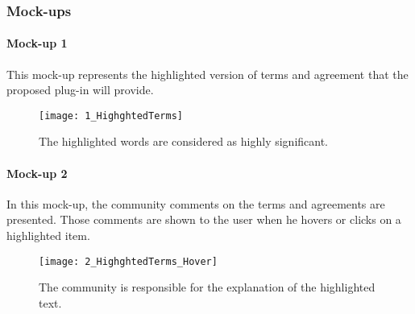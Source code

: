 \subsubsection{Mock-ups}

\paragraph{Mock-up 1}
This mock-up represents the highlighted version of terms and agreement that the 
proposed plug-in will provide.

\begin{figure}[H]
\centering
\texttt{[image: 1\_HighghtedTerms]}
\caption{The highlighted words are considered as highly significant.}
\end{figure}

\paragraph{Mock-up 2}
In this mock-up, the community comments on the terms and agreements are 
presented. Those comments are shown to the user when he hovers or clicks on a 
highlighted item.

\begin{figure}[H]
\centering
\texttt{[image: 2\_HighghtedTerms\_Hover]}
\caption{The community is responsible for the explanation of the highlighted 
text.}
\end{figure}


